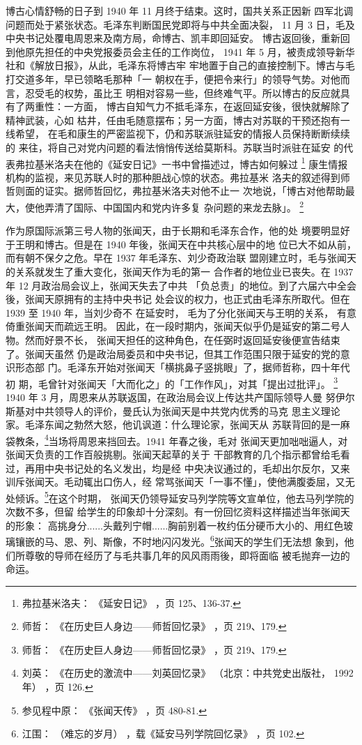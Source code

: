 博古心情舒畅的日子到  1940 年 11 月终于结束。这时，国共关系正因新
四军北调问题而处于紧张状态。毛泽东判断国民党即将与中共全面决裂，
11 月 3 日，毛及中央书记处覆电周恩来及南方局，命博古、凯丰即回延安。
博古返回後，重新回到他原先担任的中央党报委员会主任的工作岗位，
1941 年 5 月，被责成领导新华社和《解放日报》，从此，毛泽东将博古牢
牢地置于自己的直接控制下。博古与毛打交道多年，早已领略毛那种「一
朝权在手，便把令来行」的领导气势。对他而言，忍受毛的权势，虽比王
明相对容易一些，但终难气平。所以博古的反应就具有了两重性：一方面，
博古自知气力不抵毛泽东，在返回延安後，很快就解除了精神武装，心如
枯井，任由毛随意摆布；另一方面，博古对苏联的干预还抱有一线希望，
在毛和康生的严密监视下，仍和苏联派驻延安的情报人员保持断断续续的
来往，将自己对党内问题的看法悄悄传送给莫斯科。苏联当时派驻在延安
的代表弗拉基米洛夫在他的《延安日记》一书中曾描述过，博古如何躲过
\footnote{弗拉基米洛夫：
《延安日记》
，页 125、136-37.}
康生情报机构的监视，来见苏联人时的那种胆战心惊的状态。弗拉基米
洛夫的叙述得到师哲则面的证实。据师哲回忆，弗拉基米洛夫对他不止一
次地说，「博古对他帮助最大，使他弄清了国际、中国国内和党内许多复
杂问题的来龙去脉」。
\footnote{师哲：
《在历史巨人身边——师哲回忆录》
，页 219、179. 
}

作为原国际派第三号人物的张闻天，由于长期和毛泽东合作，他的处
境要明显好于王明和博古。但是在 1940 年後，张闻天在中共核心层中的地
位已大不如从前，而有朝不保夕之危。早在 1937 年毛泽东、刘少奇政治联
盟刚建立时，毛与张闻天的关系就发生了重大变化，张闻天作为毛的第一
合作者的地位业已丧失。在 1937 年 12 月政治局会议上，张闻天失去了中共
「负总责」的地位。到了六届六中全会後，张闻天原拥有的主持中央书记
处会议的权力，也正式由毛泽东所取代。但在 1939 至 1940 年，当刘少奇不
在延安时，
毛为了分化张闻天与王明的关系，
有意倚重张闻天而疏远王明。
因此，在一段时期内，张闻天似乎仍是延安的第二号人物。然而好景不长，
张闻天担任的这种角色，在任弼时返回延安後便宣告结束了。张闻天虽然
仍是政治局委员和中央书记，但其工作范围只限于延安的党的意识形态部
门。毛泽东开始对张闻天「横挑鼻子竖挑眼」了，据师哲称，四十年代初
期，毛曾针对张闻天「大而化之」的「工作作风」，对其「提出过批评」。
\footnote{师哲：
《在历史巨人身边——师哲回忆录》
，页 219、179.}
1940 年 3 月，周恩来从苏联返国，在政治局会议上传达共产国际领导人曼
努伊尔斯基对中共领导人的评价，曼氏认为张闻天是中共党内优秀的马克
思主义理论家。毛泽东闻之勃然大怒，他讥讽道：什么理论家，张闻天从
苏联背回的是一麻袋教条，\footnote{刘英：
《在历史的激流中——刘英回忆录》
（北京：中共党史出版社， 1992 年）
，页 126. }当场将周恩来挡回去。1941 年春之後，毛对
张闻天更加咄咄逼人，对张闻天负责的工作百般挑剔。张闻天起草的关于
干部教育的几个指示都曾给毛看过，再用中央书记处的名义发出，均是经
中央决议通过的，毛却出尔反尔，又来训斥张闻天。毛动辄出口伤人，经
常骂张闻天「一事不懂」，使他满腹委屈，又无处倾诉。\footnote{参见程中原：
《张闻天传》
，页 480-81. 
}在这个时期，
张闻天仍领导延安马列学院等文宣单位，他去马列学院的次数不多，但留
给学生的印象却十分深刻。有一份回忆资料这样描述当年张闻天的形象：
高挑身分......头戴列宁帽......胸前别着一枚约伍分硬币大小的、用红色玻
璃镶嵌的马、恩、列、斯像，不时地闪闪发光。\footnote{江围：
（难忘的岁月）
，载《延安马列学院回忆录》
，页 102. 
}张闻天的学生们无法想
象到，他们所尊敬的导师在经历了与毛共事几年的风风雨雨後，即将面临
被毛抛弃一边的命运。

